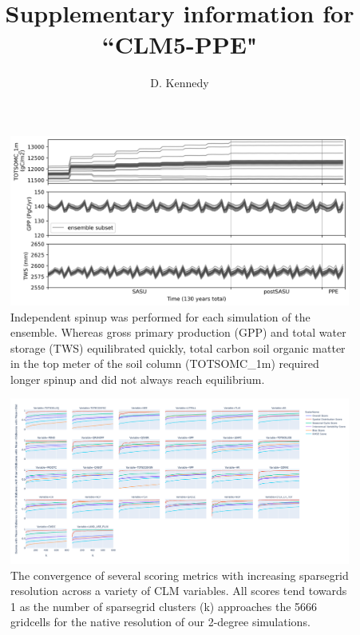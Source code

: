 \documentclass[11pt]{article}
\title{Supplementary information for ``CLM5-PPE"}
\author{D. Kennedy}
\begin{document}
\maketitle


\begin{figure}[h]
\centering
\includegraphics[width=40pc]{../figs/supp/spinup.png}
\caption{Independent spinup was performed for each simulation of the ensemble. Whereas gross primary production (GPP) and total water storage (TWS) equilibrated quickly, total carbon soil organic matter in the top meter of the soil column (TOTSOMC\_1m) required longer spinup and did not always reach equilibrium.}
\label{supp:spinup}
\end{figure}


\begin{landscape}
\begin{figure}[h]
\centering
\includegraphics[width=60pc]{../figs/supp/ilamb_lines.png}
\caption{The convergence of several scoring metrics with increasing sparsegrid resolution across a variety of CLM variables. All scores tend towards 1 as the number of sparsegrid clusters (k) approaches the 5666 gridcells for the native resolution of our 2-degree simulations. }
\label{supp:ilamb}
\end{figure}
\end{landscape}
\end{document}

